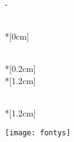 \thispagestyle{empty}             %
\calccentering{\unitlength}
\begin{adjustwidth*}{\unitlength}{-\unitlength}
    \begin{adjustwidth}{-0.5cm}{-0.5cm}
        \sffamily
        \begin{flushright}
            \thesistypeabbr{} \\*[0cm]
            \thesistype{}\\
        \end{flushright}
        \vspace*{\fill}
        \noindent
        \begin{flushleft}
            \HUGE \thesistitle{}\\*[0.2cm]
            \Huge \thesissubtitle{}\\*[1.2cm]
        \end{flushleft}
        \parbox[b]{0.5\linewidth}{%
            \LARGE
            \thesisauthor{}\\*[1.2cm]
            \Large
            \thesislocation{} \the\year
        }
        \hfill\texttt{[image: fontys]}
    \end{adjustwidth}
\end{adjustwidth*}
\normalfont
\normalsize
